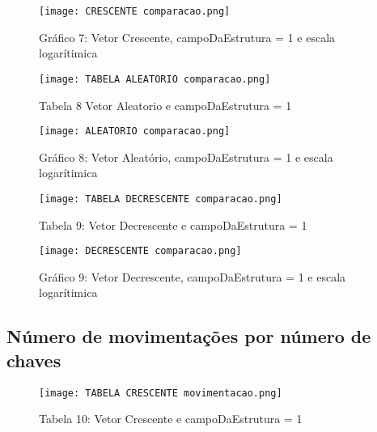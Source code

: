 \documentclass[a4paper, 12pt]{article}
\begin{document}
\begin{figure}[H] %
    \centering
    \texttt{[image: CRESCENTE comparacao.png]}
    \captionsetup{labelformat=empty} %
    \caption{Gráfico 7: Vetor Crescente, campoDaEstrutura = 1 e escala logarítimica}
    \label{fig:exemplo}
\end{figure}

\begin{figure}[H] %
    \centering
    \texttt{[image: TABELA ALEATORIO comparacao.png]}
    \captionsetup{labelformat=empty} %
    \caption{Tabela 8 Vetor Aleatorio e campoDaEstrutura = 1}
    \label{fig:exemplo}
\end{figure}

\begin{figure}[H] %
    \centering
    \texttt{[image: ALEATORIO comparacao.png]}
    \captionsetup{labelformat=empty} %
    \caption{Gráfico 8: Vetor Aleatório, campoDaEstrutura = 1 e escala logarítimica}
    \label{fig:exemplo}
\end{figure}

\begin{figure}[H] %
    \centering
    \texttt{[image: TABELA DECRESCENTE comparacao.png]}
    \captionsetup{labelformat=empty} %
    \caption{Tabela 9: Vetor Decrescente e campoDaEstrutura = 1}
    \label{fig:exemplo}
\end{figure}

\begin{figure}[H] %
    \centering
    \texttt{[image: DECRESCENTE comparacao.png]}
    \captionsetup{labelformat=empty} %
    \caption{Gráfico 9: Vetor Decrescente, campoDaEstrutura = 1 e escala logarítimica}
    \label{fig:exemplo}
\end{figure}

\subsection{Número de movimentações  por número de chaves}

\begin{figure}[H] %
    \centering
    \texttt{[image: TABELA CRESCENTE movimentacao.png]}
    \captionsetup{labelformat=empty} %
    \caption{Tabela 10: Vetor Crescente e campoDaEstrutura = 1}
    \label{fig:exemplo}
\end{figure}
\end{document}
